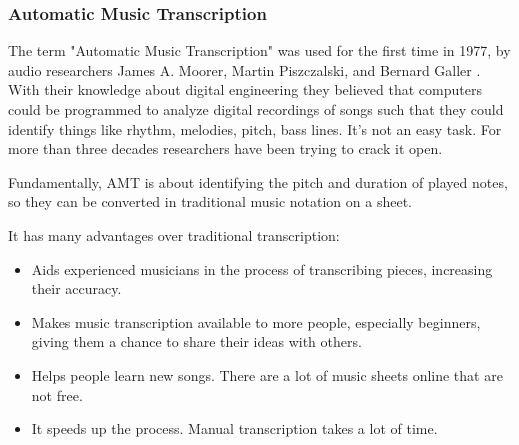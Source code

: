 \subsubsection{Automatic Music Transcription}
The term "Automatic Music Transcription" was used for the first time in 1977, by audio researchers James A. Moorer, Martin Piszczalski, and Bernard Galler \cite{transcription}. With their knowledge about digital engineering they believed that computers could be programmed to analyze digital recordings of songs such that they could identify things like rhythm, melodies, pitch, bass lines. It's not an easy task. For more than three decades researchers have been trying to crack it open. \par

Fundamentally, AMT is about identifying the pitch and duration of played notes, so they can be converted in traditional music notation on a sheet. \par

It has many advantages over traditional transcription:
\begin{itemize}
	\item Aids experienced musicians in the process of transcribing pieces, increasing their accuracy.
	\item Makes music transcription available to more people, especially beginners, giving them a chance to share their ideas with others.
	\item Helps people learn new songs. There are a lot of music sheets online that are not free. 
	\item It speeds up the process. Manual transcription takes a lot of time.
\end{itemize}

